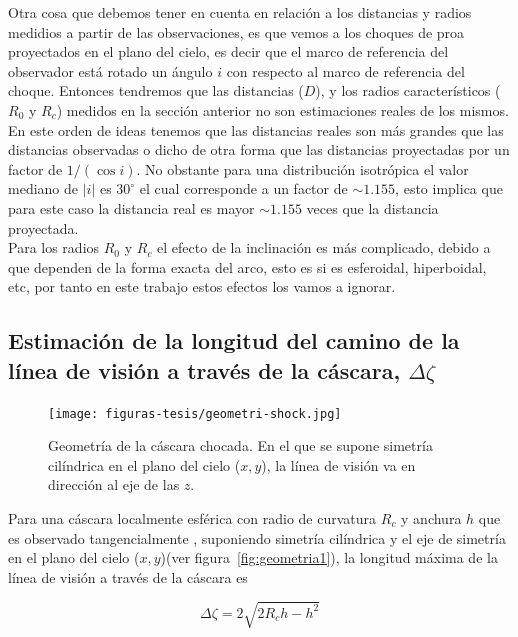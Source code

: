 Otra cosa que debemos  tener en cuenta en relación a los distancias y radios medidios a partir de las observaciones, es que vemos a los choques de proa proyectados en el plano del cielo, es decir que el marco de referencia del observador está rotado un ángulo \(i\) con respecto al marco de referencia del choque. Entonces tendremos que las distancias (\(D\)), y los  radios característicos (\(R_{0}\) y \(R_{c}\)) medidos en la sección anterior no son estimaciones reales de los mismos.\\ 

En este orden de ideas tenemos que las distancias reales son más grandes que las distancias observadas o dicho de otra forma que las distancias proyectadas por un factor de \(1/(\cos i)\). No obstante para una distribución isotrópica el valor mediano de \(|i|\) es \(30^{\circ}\) el cual corresponde a un factor de \(\sim1.155\), esto implica que para este caso la distancia real es mayor \(\sim1.155\) veces que la distancia proyectada.\\ 

Para los radios \(R_{0}\) y \(R_{c}\) el efecto de la inclinación es más complicado, debido a que dependen de la forma exacta del arco, esto es si es esferoidal, hiperboidal, etc, por tanto en este trabajo estos efectos los vamos a ignorar.

\subsection{Estimación de la longitud del camino de la línea de visión a través de la cáscara, \(\Delta \zeta\)}
\label{sec:camino}

\begin{figure}
  \centering
  \texttt{[image: figuras-tesis/geometri-shock.jpg]}
  \caption{Geometría de la cáscara chocada. En el que se supone simetría cilíndrica en el plano del cielo (\(x, y\)), la línea de visión va en dirección al eje de las \(z\).}
  \label{fig:geometria}
\end{figure}

Para una cáscara localmente esférica con radio de curvatura \(R_{c}\) y anchura \(h\) que es observado tangencialmente \citeauthor{Henney:2013a}, suponiendo simetría cilíndrica y el eje de simetría en el plano del cielo (\(x, y\))(ver figura~\ref{fig:geometria1}), la longitud máxima de la línea de visión a través de la cáscara es


\begin{equation}
  \label{eq:line-singht}
   \Delta \zeta = 2\sqrt{2R_{c}h -h^{2}}
\end{equation}

